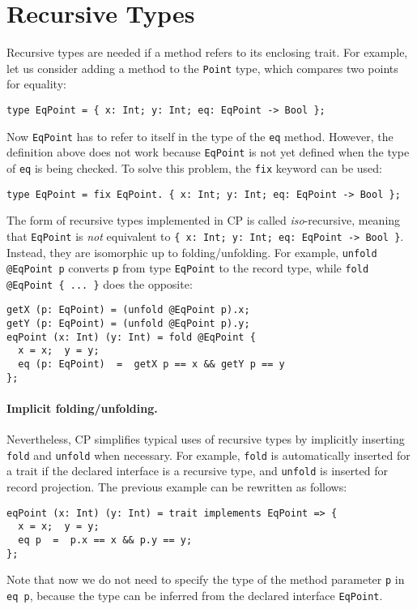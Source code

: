 \section{Recursive Types}

Recursive types are needed if a method refers to its enclosing trait. For
example, let us consider adding a method to the \lstinline{Point} type, which
compares two points for equality:
\begin{lstlisting}
type EqPoint = { x: Int; y: Int; eq: EqPoint -> Bool };
\end{lstlisting}
Now \lstinline{EqPoint} has to refer to itself in the type of the \lstinline{eq}
method. However, the definition above does not work because \lstinline{EqPoint} is
not yet defined when the type of \lstinline{eq} is being checked. To solve this
problem, the \lstinline{fix} keyword can be used:
\begin{lstlisting}
type EqPoint = fix EqPoint. { x: Int; y: Int; eq: EqPoint -> Bool };
\end{lstlisting}
The form of recursive types implemented in CP is called \emph{iso}-recursive,
meaning that \lstinline{EqPoint} is \emph{not} equivalent to
\lstinline|{ x: Int; y: Int; eq: EqPoint -> Bool }|. Instead, they are isomorphic
up to folding/unfolding. For example, \lstinline{unfold @EqPoint p} converts
\lstinline{p} from type \lstinline{EqPoint} to the record type, while
\lstinline|fold @EqPoint { ... }| does the opposite:
\begin{lstlisting}
getX (p: EqPoint) = (unfold @EqPoint p).x;
getY (p: EqPoint) = (unfold @EqPoint p).y;
eqPoint (x: Int) (y: Int) = fold @EqPoint {
  x = x;  y = y;
  eq (p: EqPoint)  =  getX p == x && getY p == y
};
\end{lstlisting}

\paragraph{Implicit folding/unfolding.}
Nevertheless, CP simplifies typical uses of recursive types by implicitly
inserting \lstinline{fold} and \lstinline{unfold} when necessary. For example,
\lstinline{fold} is automatically inserted for a trait if the declared interface
is a recursive type, and \lstinline{unfold} is inserted for record projection.
The previous example can be rewritten as follows:
\begin{lstlisting}
eqPoint (x: Int) (y: Int) = trait implements EqPoint => {
  x = x;  y = y;
  eq p  =  p.x == x && p.y == y;
};
\end{lstlisting}
Note that now we do not need to specify the type of the method parameter
\lstinline{p} in \lstinline{eq p}, because the type can be inferred from the
declared interface \lstinline{EqPoint}.


